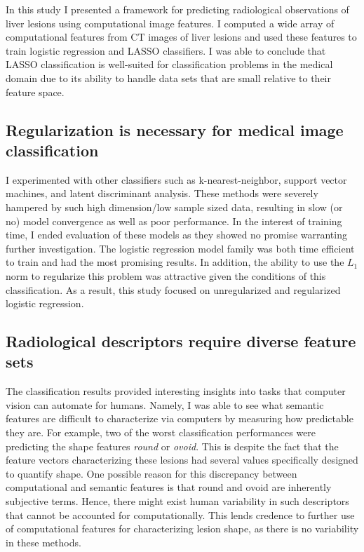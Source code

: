 In this study I presented a framework for predicting radiological observations of liver lesions using computational image features. I computed a wide array of computational features from CT images of liver lesions and used these features to train logistic regression and LASSO classifiers. I was able to conclude that LASSO classification is well-suited for classification problems in the medical domain due to its ability to handle data sets that are small relative to their feature space.

\subsection{Regularization is necessary for medical image classification}
I experimented with other classifiers such as k-nearest-neighbor, support vector machines, and latent discriminant analysis. These methods were severely hampered by such high dimension/low sample sized data, resulting in slow (or no) model convergence as well as poor performance. In the interest of training time, I ended evaluation of these models as they showed no promise warranting further investigation. The logistic regression model family was both time efficient to train and had the most promising results. In addition, the ability to use the $L_1$ norm to regularize this problem was attractive given the conditions of this classification. As a result, this study focused on unregularized and regularized logistic regression. 

\subsection{Radiological descriptors require diverse feature sets}
The classification results provided interesting insights into tasks that computer vision can automate for humans. Namely, I was able to see what semantic features are difficult to characterize via computers by measuring how predictable they are. For example, two of the worst classification performances were predicting the shape features \emph{round} or \emph{ovoid}. This is despite the fact that the feature vectors characterizing these lesions had several values specifically designed to quantify shape. One possible reason for this discrepancy between computational and semantic features is that round and ovoid are inherently subjective terms. Hence, there might exist human variability in such descriptors that cannot be accounted for computationally. This lends credence to further use of computational features for characterizing lesion shape, as there is no variability in these methods. 

